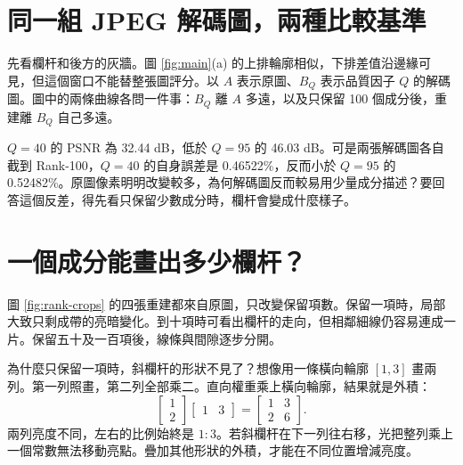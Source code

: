 \documentclass[12pt,a4paper,onecolumn]{article}
\begin{document}
\section{同一組 JPEG 解碼圖，兩種比較基準}

先看欄杆和後方的灰牆。圖 \ref{fig:main}(a) 的上排輪廓相似，下排差值沿邊緣可見，但這個窗口不能替整張圖評分。以 $A$ 表示原圖、$B_Q$ 表示品質因子 $Q$ 的解碼圖。圖中的兩條曲線各問一件事：$B_Q$ 離 $A$ 多遠，以及只保留 100 個成分後，重建離 $B_Q$ 自己多遠。


$Q=40$ 的 PSNR 為 32.44 dB，低於 $Q=95$ 的 46.03 dB。可是兩張解碼圖各自截到 Rank-100，$Q=40$ 的自身誤差是 0.46522\%，反而小於 $Q=95$ 的 0.52482\%。原圖像素明明改變較多，為何解碼圖反而較易用少量成分描述？要回答這個反差，得先看只保留少數成分時，欄杆會變成什麼樣子。

\section{一個成分能畫出多少欄杆？}

圖 \ref{fig:rank-crops} 的四張重建都來自原圖，只改變保留項數。保留一項時，局部大致只剩成帶的亮暗變化。到十項時可看出欄杆的走向，但相鄰細線仍容易連成一片。保留五十及一百項後，線條與間隙逐步分開。


為什麼只保留一項時，斜欄杆的形狀不見了？想像用一條橫向輪廓 $[1,3]$ 畫兩列。第一列照畫，第二列全部乘二。直向權重乘上橫向輪廓，結果就是外積：
\begin{equation}
 \begin{bmatrix}1\\2\end{bmatrix}
 \begin{bmatrix}1&3\end{bmatrix}
 =\begin{bmatrix}1&3\\2&6\end{bmatrix}.
\end{equation}
兩列亮度不同，左右的比例始終是 $1:3$。若斜欄杆在下一列往右移，光把整列乘上一個常數無法移動亮點。疊加其他形狀的外積，才能在不同位置增減亮度。
\end{document}
